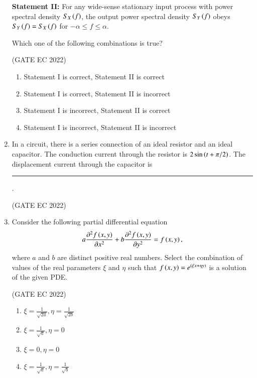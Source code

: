 \documentclass[journal,12pt,onecolumn]{IEEEtran}
\theoremstyle{remark}
\begin{document}
\begin{enumerate}
    \textbf{Statement II:} For any wide-sense stationary input process with power spectral density $S_X\left(f\right)$, the output power spectral density $S_Y\left(f\right)$ obeys $S_Y\left(f\right) = S_X\left(f\right)$ for $-\alpha \le f \le \alpha$.
    
    Which one of the following combinations is true?

    \hfill{(GATE EC 2022)}
    \begin{enumerate}
        \item Statement I is correct, Statement II is correct
        \item Statement I is correct, Statement II is incorrect
        \item Statement I is incorrect, Statement II is correct
        \item Statement I is incorrect, Statement II is incorrect
    \end{enumerate}

    \item In a circuit, there is a series connection of an ideal resistor and an ideal capacitor. The conduction current  through the resistor is $2\sin\left(t+\pi/2\right)$. The displacement current  through the capacitor is \rule{2cm}{0.4pt}.
    
    \hfill{(GATE EC 2022)}
    \begin{enumerate}
    \end{enumerate}

    \item Consider the following partial differential equation 
    \begin{align*}
        a \frac{\partial^2 f\left(x,y\right)}{\partial x^2} + b \frac{\partial^2 f\left(x,y\right)}{\partial y^2} = f\left(x,y\right),
    \end{align*}
    where $a$ and $b$ are distinct positive real numbers. Select the combination of values of the real parameters $\xi$ and $\eta$ such that $f\left(x,y\right) = e^{\left(\xi x + \eta y\right)}$ is a solution of the given PDE.

    \hfill{(GATE EC 2022)}
    \begin{enumerate}
        \item $\xi = \frac{1}{\sqrt{2a}},  \eta = \frac{1}{\sqrt{2b}}$
        \item $\xi = \frac{1}{\sqrt{a}},  \eta = 0$
        \item $\xi = 0, \eta = 0$
        \item $\xi = \frac{1}{\sqrt{a}}, \eta = \frac{1}{\sqrt{b}}$
    \end{enumerate}


\end{enumerate}
\end{document}
